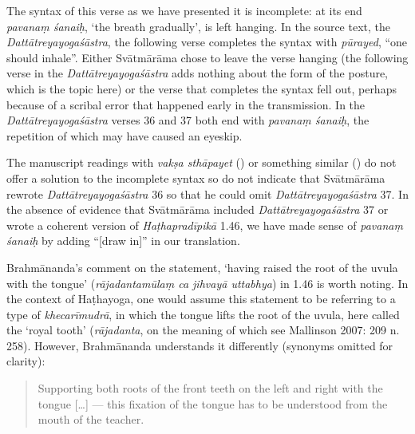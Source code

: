 \begin{ekdosis}
\begin{philcomm}[hp01_045]

The syntax of this verse as we have presented it is incomplete: at its end \emph{pavanaṃ śanaiḥ}, `the breath gradually', is left hanging. In the source text, the \emph{Dattātreyayogaśāstra}, the following verse completes the syntax with \emph{pūrayed}, “one should inhale”. Either Svātmārāma chose to leave the verse hanging (the following verse in the \emph{Dattātreyayogaśāstra} adds nothing about the form of the posture, which is the topic here) or the verse that completes the syntax fell out, perhaps because of a scribal error that happened early in the transmission. In the \emph{Dattātreyayogaśāstra} verses 36 and 37 both end with \emph{pavanaṃ śanaiḥ}, the repetition of which may have caused an eyeskip.


The manuscript readings with \emph{vakṣa sthāpayet} () or something similar () do not offer a solution to the incomplete syntax so do not indicate that Svātmārāma rewrote \emph{Dattātreyayogaśāstra} 36 so that he could omit \emph{Dattātreyayogaśāstra} 37. In the absence of evidence that Svātmārāma included \emph{Dattātreyayogaśāstra} 37 or wrote a coherent version of \emph{Haṭhapradīpikā} 1.46, we have made sense of \emph{pavanaṃ śanaiḥ} by adding “[draw in]” in our translation. 

Brahmānanda's comment on the statement, `having raised the root of the uvula with the tongue' (\emph{rājadantamūlaṃ ca jihvayā uttabhya}) in 1.46 is worth noting. In the context of Haṭhayoga, one would assume this statement to be referring to a type of  \emph{khecarīmudrā}, in which the tongue lifts the root of the uvula, here called the `royal tooth' (\emph{rājadanta}, on the meaning of which see Mallinson 2007: 209 n. 258). However, Brahmānanda understands it differently (synonyms omitted for clarity): 
\begin{quote}
Supporting both roots of the front teeth on the left and right with the tongue [\ldots] — this fixation of the tongue has to be understood from the mouth of the teacher.%


\end{quote}
\end{philcomm}
\end{ekdosis}
